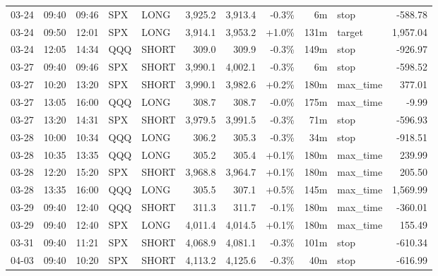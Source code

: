 \documentclass[11pt,a4paper,twoside]{article}
\begin{document}
\begin{center}
\begin{longtable}{>{\color{txtmain}}l l l l l r r r r >{\color{txtmain}}l r}
03-24 & 09:40 & 09:46 & SPX & LONG & 3,925.2 & 3,913.4 & \textcolor{lossred}{-0.3\%} & 6m & stop & \textcolor{lossred}{-588.78} \\
03-24 & 09:50 & 12:01 & SPX & LONG & 3,914.1 & 3,953.2 & \textcolor{wingreen}{+1.0\%} & 131m & target & \textcolor{wingreen}{1,957.04} \\
03-24 & 12:05 & 14:34 & QQQ & SHORT & 309.0 & 309.9 & \textcolor{lossred}{-0.3\%} & 149m & stop & \textcolor{lossred}{-926.97} \\
03-27 & 09:40 & 09:46 & SPX & SHORT & 3,990.1 & 4,002.1 & \textcolor{lossred}{-0.3\%} & 6m & stop & \textcolor{lossred}{-598.52} \\
03-27 & 10:20 & 13:20 & SPX & SHORT & 3,990.1 & 3,982.6 & \textcolor{wingreen}{+0.2\%} & 180m & max\_time & \textcolor{wingreen}{377.01} \\
03-27 & 13:05 & 16:00 & QQQ & LONG & 308.7 & 308.7 & \textcolor{lossred}{-0.0\%} & 175m & max\_time & \textcolor{lossred}{-9.99} \\
03-27 & 13:20 & 14:31 & SPX & SHORT & 3,979.5 & 3,991.5 & \textcolor{lossred}{-0.3\%} & 71m & stop & \textcolor{lossred}{-596.93} \\
03-28 & 10:00 & 10:34 & QQQ & LONG & 306.2 & 305.3 & \textcolor{lossred}{-0.3\%} & 34m & stop & \textcolor{lossred}{-918.51} \\
03-28 & 10:35 & 13:35 & QQQ & LONG & 305.2 & 305.4 & \textcolor{wingreen}{+0.1\%} & 180m & max\_time & \textcolor{wingreen}{239.99} \\
03-28 & 12:20 & 15:20 & SPX & SHORT & 3,968.8 & 3,964.7 & \textcolor{wingreen}{+0.1\%} & 180m & max\_time & \textcolor{wingreen}{205.50} \\
03-28 & 13:35 & 16:00 & QQQ & LONG & 305.5 & 307.1 & \textcolor{wingreen}{+0.5\%} & 145m & max\_time & \textcolor{wingreen}{1,569.99} \\
03-29 & 09:40 & 12:40 & QQQ & SHORT & 311.3 & 311.7 & \textcolor{lossred}{-0.1\%} & 180m & max\_time & \textcolor{lossred}{-360.01} \\
03-29 & 09:40 & 12:40 & SPX & LONG & 4,011.4 & 4,014.5 & \textcolor{wingreen}{+0.1\%} & 180m & max\_time & \textcolor{wingreen}{155.49} \\
03-31 & 09:40 & 11:21 & SPX & SHORT & 4,068.9 & 4,081.1 & \textcolor{lossred}{-0.3\%} & 101m & stop & \textcolor{lossred}{-610.34} \\
04-03 & 09:40 & 10:20 & SPX & SHORT & 4,113.2 & 4,125.6 & \textcolor{lossred}{-0.3\%} & 40m & stop & \textcolor{lossred}{-616.99} \\

\end{longtable}
\end{center}
\end{document}
